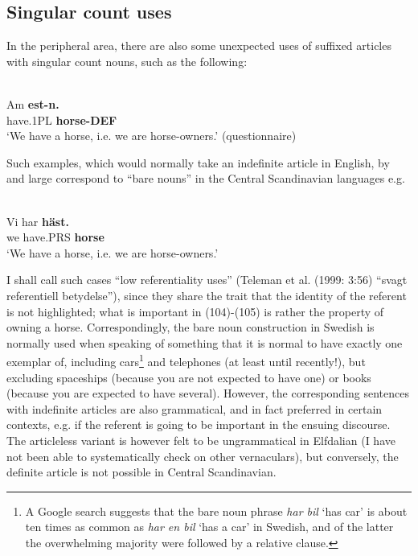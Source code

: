 \subsection{ Singular count uses}
\label{bkm:Ref224379285}
In the peripheral area, there are also some unexpected uses of suffixed articles with singular count nouns, such as the following:


\ea \label{} 
\\
\gll Am  \textbf{est-n.}\\
have.1PL  \textbf{horse-DEF}\\
\glt ‘We have a horse, i.e. we are horse-owners.’ (questionnaire)

\z

Such examples, which would normally take an indefinite article in English, by and large correspond to “bare nouns” in the Central Scandinavian languages e.g.


\ea \label{} 
\\
\gll Vi  har  \textbf{häst.}\\
we  have.PRS  \textbf{horse}\\
\glt ‘We have a horse, i.e. we are horse-owners.’

\z

I shall call such cases “low referentiality uses” (Teleman et al. (1999: 3:56) “svagt referentiell betydelse”), since they share the trait that the identity of the referent is not highlighted; what is important in (104){}-(105) is rather the property of owning a horse. Correspondingly, the bare noun construction in Swedish is normally used when speaking of something that it is normal to have exactly one exemplar of, including cars\footnote{ A Google search suggests that the bare noun phrase \textit{har bil} ‘has car’ is about ten times as common as \textit{har en bil} ‘has a car’ in Swedish, and of the latter the overwhelming majority were followed by a relative clause. } and telephones (at least until recently!), but excluding spaceships (because you are not expected to have one) or books (because you are expected to have several). However, the corresponding sentences with indefinite articles are also grammatical, and in fact preferred in certain contexts, e.g. if the referent is going to be important in the ensuing discourse. The articleless variant is however felt to be ungrammatical in Elfdalian (I have not been able to systematically check on other vernaculars), but conversely, the definite article is not possible in Central Scandinavian. 

